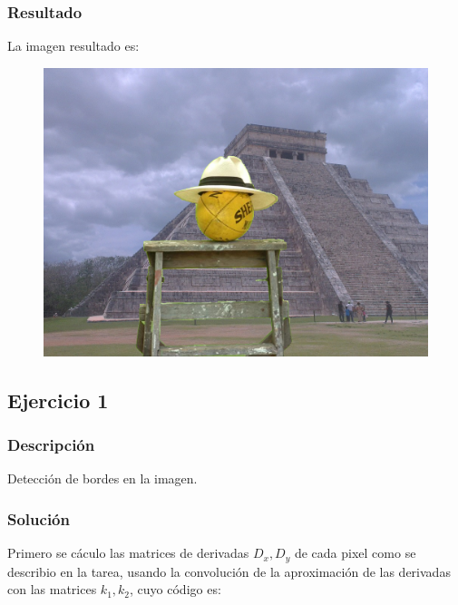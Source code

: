 \documentclass[letterpaper]{article}
\theoremstyle{definition}
\theoremstyle{lemathm}
\theoremstyle{lemathm}
\theoremstyle{lemathm}
\theoremstyle{lemademthm}
\newcommand{\1}{\mathbbm{1}}
\begin{document}
	\subsubsection*{Resultado}

	La imagen resultado es:

	\begin{figure}[H]
		\begin{center}
			\includegraphics[scale = 0.4]{../images/alpha_matting.png}
		\end{center}
	\end{figure}

	\newpage

	\subsection*{Ejercicio 1}

	\subsubsection*{Descripción}

	Detección de bordes en la imagen.

	\subsubsection*{Solución}

	Primero se cáculo las matrices de derivadas $D_x,D_y$ de cada pixel como se describio en la tarea, usando la convolución de la aproximación de las derivadas con las matrices $k_1,k_2$, cuyo código es:
\end{document}
